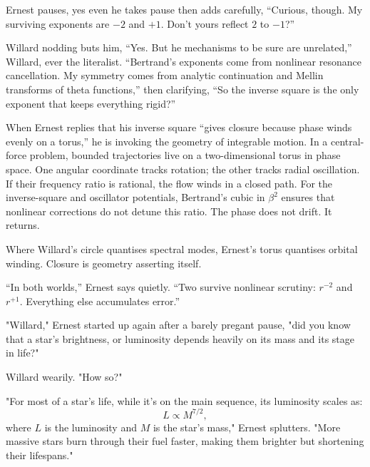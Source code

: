 \noindent
Ernest pauses, yes even he takes pause then adds carefully, “Curious, though. My surviving exponents are $-2$ and $+1$.
Don’t yours reflect $2$ to $-1$?”

\noindent
Willard nodding buts him,  “Yes. But he mechanisms to be sure are unrelated,” Willard, ever the literalist. “Bertrand’s exponents come from nonlinear resonance cancellation. My symmetry comes from analytic continuation and Mellin transforms
of theta functions,” then clarifying, “So the inverse square is the only exponent
that keeps everything rigid?”

\begin{tcolorbox}[title=Ernest's Torus: Integrability and Orbital Closure,
colback=gray!5!white,colframe=black!70!white]

When Ernest replies that his inverse square “gives closure because phase winds evenly on a torus,”
he is invoking the geometry of integrable motion. In a central-force problem, bounded trajectories live on a two-dimensional torus in phase space.
One angular coordinate tracks rotation; the other tracks radial oscillation.
If their frequency ratio is rational, the flow winds in a closed path.
For the inverse-square and oscillator potentials,
Bertrand’s cubic in $\beta^2$ ensures that nonlinear corrections do not detune this ratio.
The phase does not drift.
It returns.

Where Willard’s circle quantises spectral modes,
Ernest’s torus quantises orbital winding.
Closure is geometry asserting itself.
\end{tcolorbox}
\noindent
“In both worlds,” Ernest says quietly. “Two survive nonlinear scrutiny: $r^{-2}$ and $r^{+1}$. Everything else accumulates error.”


"Willard," Ernest started up again after a barely pregant pause, "did you know that a star's brightness, or luminosity depends heavily on its mass and its stage in life?"

Willard wearily. "How so?"

"For most of a star's life, while it’s on the main sequence, its luminosity scales as:
\[
L \propto M^{7/2},
\]
where \(L\) is the luminosity and \(M\) is the star's mass," Ernest splutters. "More massive stars burn through their fuel faster, making them brighter but shortening their lifespans."

